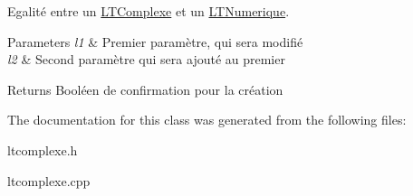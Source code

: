 Egalité entre un \hyperlink{class_l_t_complexe}{L\+T\+Complexe} et un \hyperlink{class_l_t_numerique}{L\+T\+Numerique}. 


\begin{DoxyParams}{Parameters}
{\em l1} & Premier paramètre, qui sera modifié \\
\hline
{\em l2} & Second paramètre qui sera ajouté au premier \\
\hline
\end{DoxyParams}
\begin{DoxyReturn}{Returns}
Booléen de confirmation pour la création 
\end{DoxyReturn}


The documentation for this class was generated from the following files\+:\begin{DoxyCompactItemize}
\item 
ltcomplexe.\+h\item 
ltcomplexe.\+cpp\end{DoxyCompactItemize}
